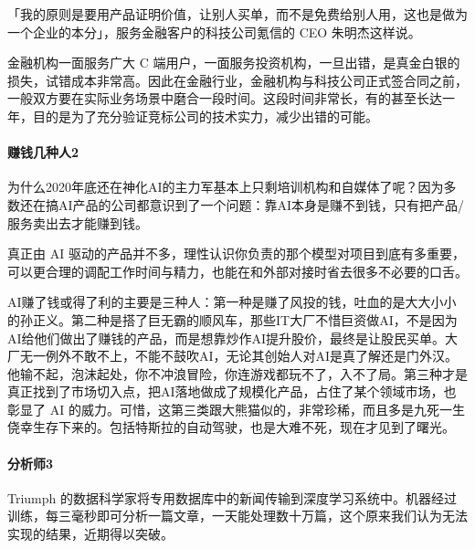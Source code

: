 \documentclass[letterpaper,11pt,english]{sphinxmanual}
\begin{document}
「我的原则是要用产品证明价值，让别人买单，而不是免费给别人用，这也是做为一个企业的本分」，服务金融客户的科技公司氪信的
CEO 朱明杰这样说。

金融机构一面服务广大 C
端用户，一面服务投资机构，一旦出错，是真金白银的损失，试错成本非常高。因此在金融行业，金融机构与科技公司正式签合同之前，一般双方要在实际业务场景中磨合一段时间。这段时间非常长，有的甚至长达一年，目的是为了充分验证竞标公司的技术实力，减少出错的可能。


\paragraph{赚钱几种人2\sphinxfootnotemark[43]}
\label{\detokenize{chapter_introduction/money:id4}}%
\begin{footnotetext}[43]\sphinxAtStartFootnote
{}
%
\end{footnotetext}\ignorespaces 
为什么2020年底还在神化AI的主力军基本上只剩培训机构和自媒体了呢？因为多数还在搞AI产品的公司都意识到了一个问题：靠AI本身是赚不到钱，只有把产品/服务卖出去才能赚到钱。

真正由 AI
驱动的产品并不多，理性认识你负责的那个模型对项目到底有多重要，可以更合理的调配工作时间与精力，也能在和外部对接时省去很多不必要的口舌。

AI赚了钱或得了利的主要是三种人：第一种是赚了风投的钱，吐血的是大大小小的孙正义。第二种是搭了巨无霸的顺风车，那些IT大厂不惜巨资做AI，不是因为AI给他们做出了赚钱的产品，而是想靠炒作AI提升股价，最终是让股民买单。大厂无一例外不敢不上，不能不鼓吹AI，无论其创始人对AI是真了解还是门外汉。他输不起，泡沫起处，你不冲浪冒险，你连游戏都玩不了，入不了局。第三种才是真正找到了市场切入点，把AI落地做成了规模化产品，占住了某个领域市场，也彰显了
AI
的威力。可惜，这第三类跟大熊猫似的，非常珍稀，而且多是九死一生侥幸生存下来的。包括特斯拉的自动驾驶，也是大难不死，现在才见到了曙光。


\paragraph{分析师3\sphinxfootnotemark[44]}
\label{\detokenize{chapter_introduction/money:id5}}%
\begin{footnotetext}[44]\sphinxAtStartFootnote
{}
%
\end{footnotetext}\ignorespaces 
Triumph
的数据科学家将专用数据库中的新闻传输到深度学习系统中。机器经过训练，每三毫秒即可分析一篇文章，一天能处理数十万篇，这个原来我们认为无法实现的结果，近期得以突破。
\end{document}
